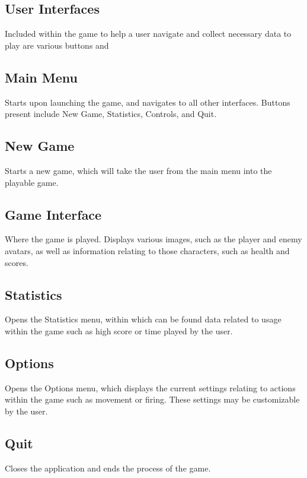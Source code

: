 \subsection*{User Interfaces}
    Included within the game to help a user navigate and collect
    necessary data to play are various buttons and 
    
\subsection*{Main Menu}
    Starts upon launching the game, and navigates to all other
    interfaces. Buttons present include New Game, Statistics,
    Controls, and Quit. 
    
\subsection*{New Game}
    Starts a new game, which will take the user from the main menu
    into the playable game.
    
\subsection*{Game Interface}
    Where the game is played. Displays various images, such as
    the player and enemy avatars, as well as information relating
    to those characters, such as health and scores.

\subsection*{Statistics}
    Opens the Statistics menu, within which can be found data related
    to usage within the game such as high score or time played by the
    user.
    
\subsection*{Options}
    Opens the Options menu, which displays the current settings
    relating to actions within the game such as movement or firing.
    These settings may be customizable by the user.
    
\subsection*{Quit}
    Closes the application and ends the process of the game.
